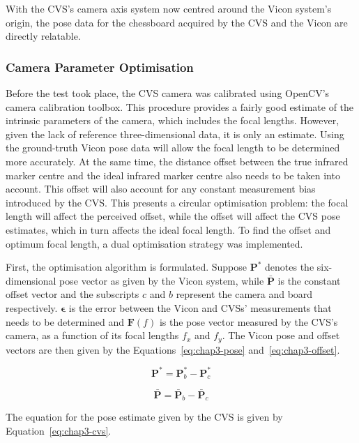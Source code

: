 With the CVS's camera axis system now centred around the Vicon system's origin, the pose data for the chessboard acquired by the CVS and the Vicon are directly relatable. 

\subsubsection{Camera Parameter Optimisation}
\label{sec:focal-optimisation}

Before the test took place, the CVS camera was calibrated using OpenCV's camera calibration toolbox. This procedure provides a fairly good estimate of the intrinsic parameters of the camera, which includes the focal lengths. However, given the lack of reference three-dimensional data, it is only an estimate. Using the ground-truth Vicon pose data will allow the focal length to be determined more accurately. At the same time, the distance offset between the true infrared marker centre and the ideal infrared marker centre also needs to be taken into account. This offset will also account for any constant measurement bias introduced by the CVS\@. This presents a circular optimisation problem: the focal length will affect the perceived offset, while the offset will affect the CVS pose estimates, which in turn affects the ideal focal length. To find the offset and optimum focal length, a dual optimisation strategy was implemented.  

First, the optimisation algorithm is formulated. Suppose $\bm{P}^*$ denotes the six-dimensional pose vector as given by the Vicon system, while $\bar{\bm{P}}$ is the constant offset vector and the subscripts $c$ and $b$ represent the camera and board respectively. $\bm{\epsilon}$ is the error between the Vicon and CVSs' measurements that needs to be determined and $\bm{F}(f)$ is the pose vector measured by the CVS's camera, as a function of its focal lengths $f_x$ and $f_y$. The Vicon pose and offset vectors are then given by the Equations~\ref{eq:chap3-pose} and~\ref{eq:chap3-offset}.

\begin{equation}
 \label{eq:chap3-pose}
  \bm{P}^* = \bm{P}^*_b - \bm{P}^*_c
\end{equation}

\begin{equation}
  \label{eq:chap3-offset}
  \bar{\bm{P}} = \bar{\bm{P}}_b - \bar{\bm{P}}_c
\end{equation}

The equation for the pose estimate given by the CVS is given by Equation~\ref{eq:chap3-cvs}.

